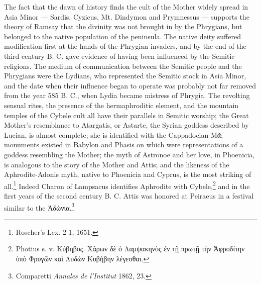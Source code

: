 \documentclass[a4paper, 11pt, oneside, polutonikogreek, english]{article}
\begin{document}
The fact that the dawn of history finds the cult of the Mother widely spread in Asia Minor --- Sardis, Cyzicus, Mt. Dindymon and Prymnessus --- supports the theory of Ramsay that the divinity was not brought in by the Phrygians, but belonged to the native population of the peninsula. The native deity suffered modification first at the hands of the Phrygian invaders, and by the end of the third century B. C. gave evidence of having been influenced by the Semitic religions. The medium of communication between the Semitic people and the Phrygians were the Lydians, who represented the Semitic stock in Asia Minor, and the date when their influence began to operate was probably not far removed from the year 585 B. C., when Lydia became mistress of Phrygia. The revolting sensual rites, the presence of the hermaphroditic element, and the mountain temples of the Cybele cult all have their parallels in Semitic worship; the Great Mother's resemblance to Atargatis, or Astarte, the Syrian goddess described by Lucian, is almost complete; she is identified with the Cappadocian Μᾶ; monuments existed in Babylon and Phasis on which were representations of a goddess resembling the Mother; the myth of Astronoe and her love, in Phoenicia, is analogous to the story of the Mother and Attis; and the likeness of the Aphrodite-Adonis myth, native to Phoenicia and Cyprus, is the most striking of all.\footnote{Roscher's Lex. 2 1, 1651.} Indeed Charon of Lampsacus identifies Aphrodite with Cybele,\footnote{Photius s. v. Κύβηβος. Χάρων δὲ ὁ Λαμψακηνὸς ἐν τῇ πρωτῇ τὴν Ἀφροδίτην ὑπὸ Φρυγῶν καὶ Λυδὼν Κυβἡβην λέγεσθαι.} and in the first years of the second century B. C. Attis was honored at Peiraeus in a festival similar to the Ἀδώνια.\footnote{Comparetti \emph{Annales de l'Institut} 1862, 23.}
 
\end{document}

